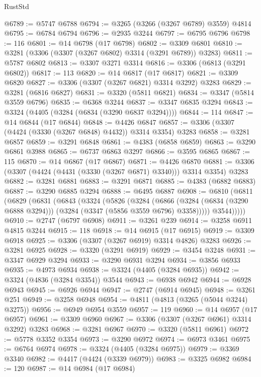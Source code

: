 \begin{lexlean}{RustStd}
\begin{coremodule}
@6789 := @5747 @6788
@6794 := @3265 (@3266 (@3267 @6789) @3559) @4814
@6795 := @6784 @6794
@6796 := @2935 @3244
@6797 := @6795 @6796
@6798 := 116
@6801 := @14 @6798 (@17 @6798)
@6802 := @3309 @6801
@6810 := @3281 (@3306 (@3307 (@3267 @6802) @3314 (@3291 @6789)) @3283)
@6811 := @5787 @6802
@6813 := @3307 @3271 @3314
@6816 := @3306 (@6813 (@3291 @6802))
@6817 := 113
@6820 := @14 @6817 (@17 @6817)
@6821 := @3309 @6820
@6827 := @3306 (@3307 (@3267 @6821) @3314 @3292) @3283
@6829 := @3281 (@6816 @6827)
@6831 := @3320 (@5811 @6821)
@6834 := @3347 (@5814 @3559 @6796)
@6835 := @6368 @3244
@6837 := @3347 @6835 @3294
@6843 := @3324 (@4405 (@3284 (@6834 (@3290 @6837 @3294))))
@6844 := 114
@6847 := @14 @6844 (@17 @6844)
@6848 := @4426 @6847
@6857 := @3306 (@3307 (@4424 (@3330 (@3267 @6848) @4432)) @3314 @3354) @3283
@6858 := @3281 @6857
@6859 := @3291 @6848
@6861 := @4383 (@6858 @6859)
@6863 := @3290 @6861 @3988
@6865 := @6737 @6863 @3297
@6866 := @3595 @6865
@6867 := 115
@6870 := @14 @6867 (@17 @6867)
@6871 := @4426 @6870
@6881 := @3306 (@3307 (@4424 (@4431 (@3330 (@3267 @6871) @3340))) @3314 @3354) @3283
@6882 := @3281 @6881
@6883 := @3291 @6871
@6885 := @4383 (@6882 @6883)
@6887 := @3290 @6885 @3294
@6888 := @6495 @6887
@6908 := @6810
    (@6811
      (@6829
        (@6831
          (@6843
            (@3324
              (@5826
                (@3284
                  (@6866
                    (@3284 (@6834 (@3290 @6888 @3294)))
                    (@3284 (@3347 (@5856 @3559 @6796) @3358)))))
              @3544)))))
@6910 := @2747 (@6797 @6908)
@6911 := @3261 @239
@6914 := @3258 @6911 @4815 @3244
@6915 := 118
@6918 := @14 @6915 (@17 @6915)
@6919 := @3309 @6918
@6925 := @3306 (@3307 (@3267 @6919) @3314 @4826) @3283
@6926 := @3281 @6925
@6928 := @3320 (@3291 @6919)
@6929 := @3454 @3248
@6931 := @3347 @6929 @3294
@6933 := @3290 @6931 @3294
@6934 := @3856 @6933
@6935 := @4973 @6934
@6938 := @3324 (@4405 (@3284 @6935))
@6942 := @3324 (@4836 (@3284 @3354)) @3544
@6943 := @6938 @6942
@6944 := @6928 @6943
@6945 := @6926 @6944
@6947 := @2747 (@6914 @6945)
@6948 := @3261 @251
@6949 := @3258 @6948
@6954 := @4811 (@4813 (@3265 (@5044 @3244) @3275))
@6956 := @6949 @6954 @3559
@6957 := 119
@6960 := @14 @6957 (@17 @6957)
@6961 := @3309 @6960
@6967 := @3306 (@3307 (@3267 @6961) @3314 @3292) @3283
@6968 := @3281 @6967
@6970 := @3320 (@5811 @6961)
@6972 := @5778 @3352 @3354
@6973 := @3290 @6972
@6974 := @6973 @3461
@6975 := @6764 @6974
@6978 := @3324 (@4405 (@3284 @6975))
@6979 := @3369 @3340
@6982 := @4417 (@4424 (@3339 @6979))
@6983 := @3325 @6982
@6984 := 120
@6987 := @14 @6984 (@17 @6984)

\end{coremodule}
\end{lexlean}
